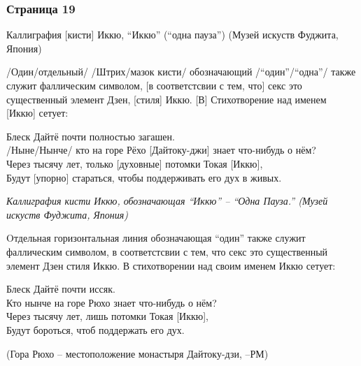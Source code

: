 \subsubsection{Страница 19}
\begin{ver}
Каллиграфия [кисти] Иккю, ``Иккю'' (``одна пауза'') (Музей искуств Фуджита,
Япония)  
\end{ver}

\begin{ver}
/Один/отдельный/ /Штрих/мазок кисти/ обозначающий /``один''/``одна''/
также служит фаллическим символом, [в соответстсвии с тем, что] секс
это существенный элемент Дзен, [стиля] Иккю. [В] Стихотворение над
именем [Иккю] сетует:  
\end{ver}

\begin{ver}
  \begin{verses}
    Блеск Дайтё почти полностью загашен.\\
    /Ныне/Нынче/ кто на горе Рёхо [Дайтоку-джи] знает что-нибудь о
    нём?\\
    Через тысячу лет, только [духовные] потомки Токая [Иккю],\\
    Будут [упорно] стараться, чтобы поддерживать его дух в живых.
  \end{verses}
\end{ver}
\begin{ver}[1]\it
Каллиграфия кисти Иккю, обозначающая ``Иккю'' -- ``Одна Пауза.'' (Музей
искуств Фуджита, Япония)
\end{ver}

\begin{ver}[1]
Oтдельная горизонтальная линия обозначающая ``один''
также служит фаллическим символом, в соответстсвии с тем, что секс
это существенный элемент Дзен стиля Иккю. В стихотворении над
своим именем Иккю сетует:  
\end{ver}

\begin{ver}[1]
  \begin{verses}
    Блеск Дайтё почти иссяк.\\
    Кто нынче на горе Рюхо знает что-нибудь о
    нём?\\
    Через тысячу лет, лишь потомки Токая [Иккю],\\
    Будут бороться, чтоб поддержать его дух.
  \end{verses}

(Гора Рюхо -- местоположение монастыря Дайтоку-дзи, --РМ)
\end{ver}

